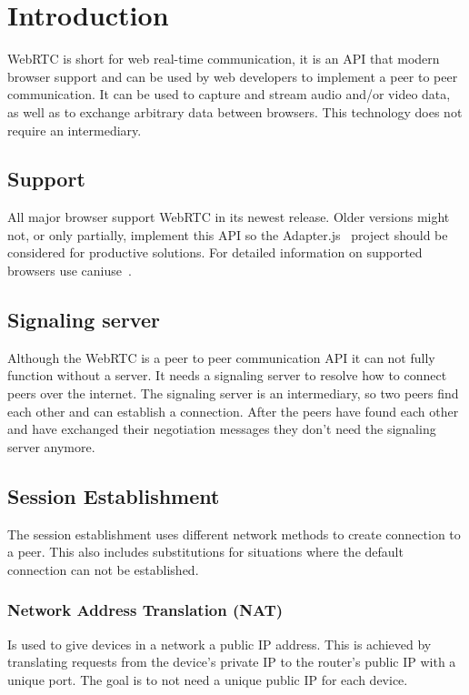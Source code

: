 \clearpage
\chapter{Introduction}
WebRTC is short for web real-time communication, it is an API that modern browser support and can be used by web developers to implement a peer to peer communication. It can be used to capture and stream audio and/or video data, as well as to exchange arbitrary data between browsers. This technology does not require an intermediary.

\section{Support}
All major browser support WebRTC in its newest release. Older versions might not, or only partially, implement this API so the Adapter.js~\autocite{adapterjs} project should be considered for productive solutions. For detailed information on supported browsers use caniuse~\autocite{caniuse}.

\section{Signaling server}
Although the WebRTC is a peer to peer communication API it can not fully function without a server. It needs a signaling server to resolve how to connect peers over the internet. The signaling server is an intermediary, so two peers find each other and can establish a connection. After the peers have found each other and have exchanged their negotiation messages they don't need the signaling server anymore.

\section{Session Establishment}
The session establishment uses different network methods to create connection to a peer. This also includes substitutions for situations where the default connection can not be established.

\subsection{Network Address Translation (NAT)}
Is used to give devices in a network a public IP address. This is achieved by translating requests from the device's private IP to the router's public IP with a unique port. The goal is to not need a unique public IP for each device.

